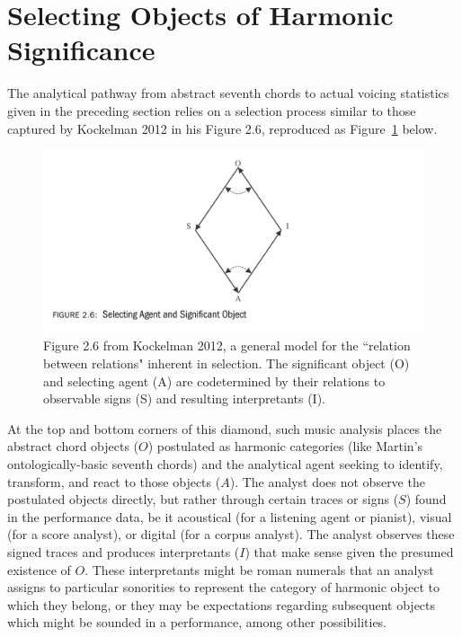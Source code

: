 \section{Selecting Objects of Harmonic Significance}

The analytical pathway from abstract seventh chords to actual voicing statistics given in the preceding section relies on a selection process similar to those captured by Kockelman 2012 in his Figure 2.6, reproduced as Figure~\ref{kockelman} below. 

\begin{figure}[h]
	\centering
	\includegraphics[width=6in]{kockelman_model.jpg}
	\caption{Figure 2.6 from Kockelman 2012, a general model for the ``relation between relations" inherent in selection.  The significant object (O) and selecting agent (A) are codetermined by their relations to observable signs (S) and resulting interpretants (I).}
	\label{kockelman}
\end{figure}

At the top and bottom corners of this diamond, such music analysis places the abstract chord objects ($O$) postulated as harmonic categories (like Martin's ontologically-basic seventh chords) and the analytical agent seeking to identify, transform, and react to those objects ($A$).  The analyst does not observe the postulated objects directly, but rather through certain traces or signs ($S$) found in the performance data, be it acoustical (for a listening agent or pianist), visual (for a score analyst), or digital (for a corpus analyst).  The analyst observes these signed traces and produces interpretants ($I$) that make sense given the presumed existence of $O$.  These interpretants might be roman numerals that an analyst assigns to particular sonorities to represent the category of harmonic object to which they belong, or they may be expectations regarding subsequent objects which might be sounded in a performance, among other possibilities.


